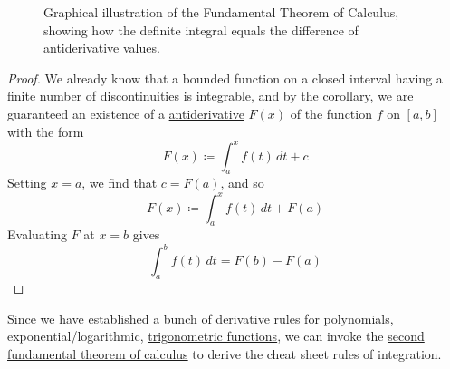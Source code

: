 \begin{theorem}
\begin{figure}[H]
      \caption{Graphical illustration of the Fundamental Theorem of Calculus, showing how the definite integral equals the difference of antiderivative values.} 
      \label{fig:ftc2-illustration}
    \end{figure}
  \end{theorem}
  \begin{proof}
		We already know that a bounded function on a closed interval having a finite number of discontinuities is integrable, and by the corollary, we are guaranteed an existence of a \hyperref[def:antiderivative]{antiderivative} $F(x)$ of the function $f$ on $[a, b]$ with the form 
    \begin{equation}
      F (x) \coloneqq \int_a^x f(t)\,dt + c
    \end{equation}
    Setting $x = a$, we find that $c = F(a)$, and so 
    \begin{equation}
      F(x) \coloneqq \int_a^x f(t)\,dt + F(a)
    \end{equation}
    Evaluating $F$ at $x = b$ gives
    \begin{equation}
      \int_a^b f(t)\,dt = F(b) - F(a)
    \end{equation}
  \end{proof}

  Since we have established a bunch of derivative rules for polynomials, exponential/logarithmic, \hyperref[def:trigonometric-functions]{trigonometric functions}, we can invoke the \hyperref[thm:ftc2]{second fundamental theorem of calculus} to derive the cheat sheet rules of integration. 

  \begin{corollary}
    \label{thm:power-rule-of-integration}

  \end{corollary}

  \begin{corollary}
    \label{thm:integration-of-exponential-and-logarithmic}
    
  \end{corollary}

